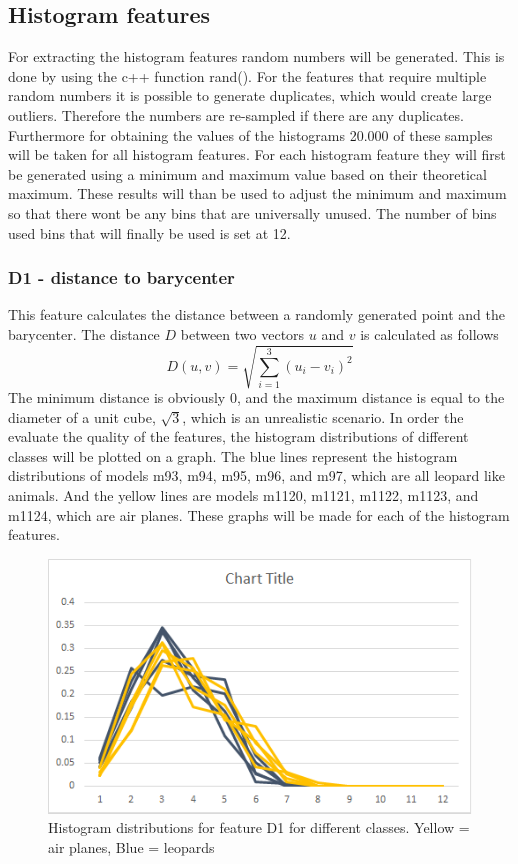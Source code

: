 \documentclass{bigdata}
\begin{document}
\subsection{Histogram features}
For extracting the histogram features random numbers will be generated. This is done by using the c++ function rand(). For the features that require multiple random numbers it is possible to generate duplicates, which would create large outliers. Therefore the numbers are re-sampled if there are any duplicates. Furthermore for obtaining the values of the histograms 20.000 of these samples will be taken for all histogram features.
For each histogram feature they will first be generated using a minimum and maximum value based on their theoretical maximum. These results will than be used to adjust the minimum and maximum so that there wont be any bins that are universally unused. The number of bins used bins that will finally be used is set at 12.

\subsubsection{D1 - distance to barycenter}
This feature calculates the distance between a randomly generated point and the barycenter. The distance $D$ between two vectors $u$ and $v$ is calculated as follows
\begin{equation}
D(u,v) = \sqrt{\sum\limits_{i=1}^3 (u_i - v_i)^2}
\end{equation}
The minimum distance is obviously 0, and the maximum distance is equal to the diameter of a unit cube, $\sqrt{3}$, which is an unrealistic scenario.
In order the evaluate the quality of the features, the histogram distributions of different classes will be plotted on a graph. The blue lines represent the histogram distributions of models m93, m94, m95, m96, and m97, which are all leopard like animals. And the yellow lines are models m1120, m1121, m1122, m1123, and m1124, which are air planes. These graphs will be made for each of the histogram features. 

\begin{figure}[h!]
    \includegraphics[width=\linewidth]{Pictures/Part3/D1.png}
    \caption{Histogram distributions for feature D1 for different classes. Yellow = air planes, Blue = leopards}
  \label{fig:eccentricity}
\end{figure}
\end{document}
